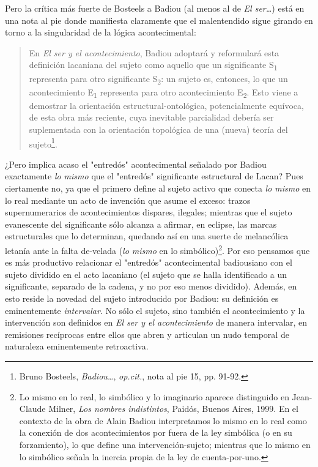 \documentclass{book}
\begin{document}
Pero la crítica más fuerte de Bosteels a Badiou (al menos al de \emph{El
ser\ldots{}}) está en una nota al pie donde manifiesta claramente que el
malentendido sigue girando en torno a la singularidad de la lógica
acontecimental:

\begin{quote}
En \emph{El ser y el acontecimiento}, Badiou adoptará y reformulará esta
definición lacaniana del sujeto como aquello que un significante
S\textsubscript{1} representa para otro significante S\textsubscript{2}:
un sujeto es, entonces, lo que un acontecimiento E\textsubscript{1}
representa para otro acontecimiento E\textsubscript{2}. Esto viene a
demostrar la orientación estructural-ontológica, potencialmente
equívoca, de esta obra más reciente, cuya inevitable parcialidad debería
ser suplementada con la orientación topológica de una (nueva) teoría del
sujeto\footnote{Bruno Bosteels, \emph{Badiou\ldots{}}, \emph{op.cit.},
  nota al pie 15, pp. 91-92.}.
\end{quote}

¿Pero implica acaso el "entredós" acontecimental señalado por Badiou
exactamente \emph{lo mismo} que el "entredós" significante estructural
de Lacan? Pues ciertamente no, ya que el primero define al sujeto activo
que conecta \emph{lo mismo} en lo real mediante un acto de invención que
asume el exceso: trazos supernumerarios de acontecimientos dispares,
ilegales; mientras que el sujeto evanescente del significante sólo
alcanza a afirmar, en eclipse, las marcas estructurales que lo
determinan, quedando así en una suerte de melancólica letanía ante la
falta de-velada (\emph{lo mismo} en lo simbólico)\footnote{Lo mismo en
  lo real, lo simbólico y lo imaginario aparece distinguido en
  Jean-Claude Milner, \emph{Los nombres indistintos}, Paidós, Buenos
  Aires, 1999. En el contexto de la obra de Alain Badiou interpretamos
  lo mismo en lo real como la conexión de dos acontecimientos por fuera
  de la ley simbólica (o en su forzamiento), lo que define una
  intervención-sujeto; mientras que lo mismo en lo simbólico señala la
  inercia propia de la ley de cuenta-por-uno.}. Por eso pensamos que es
más productivo relacionar el "entredós" acontecimental badiousiano con
el sujeto dividido en el acto lacaniano (el sujeto que se halla
identificado a un significante, separado de la cadena, y no por eso
menos dividido). Además, en esto reside la novedad del sujeto
introducido por Badiou: su definición es eminentemente
\emph{intervalar}. No sólo el sujeto, sino también el acontecimiento y
la intervención son definidos en \emph{El ser y el acontecimiento} de
manera intervalar, en remisiones recíprocas entre ellos que abren y
articulan un nudo temporal de naturaleza eminentemente retroactiva.
\end{document}
